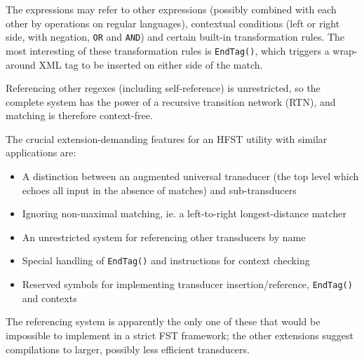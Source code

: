 \documentclass{llncs}
\begin{document}
The expressions may refer to other expressions (possibly combined with each
other by operations on regular languages), contextual conditions
(left or right side, with negation, \verb!OR! and \verb!AND!) and certain
built-in transformation rules. The most interesting of these transformation
rules is \verb!EndTag()!, which triggers a wrap-around XML tag to be inserted
on either side of the match.

Referencing other regexes (including self-reference) is unrestricted, so
the complete system has the power of a recursive transition network (RTN),
and matching is therefore context-free.

The crucial extension-demanding features for an HFST utility
with similar applications are:

\begin{itemize}
\item A distinction between an augmented universal transducer (the top level
  which echoes all input in the absence of matches) and sub-transducers
\item Ignoring non-maximal matching, ie. a left-to-right longest-distance
  matcher
\item An unrestricted system for referencing other transducers by name
\item Special handling of \verb!EndTag()! and instructions for context
  checking
\item Reserved symbols for implementing transducer insertion/reference,
  \verb!EndTag()! and contexts
\end{itemize}

The referencing system is apparently the only one of these that would be
impossible to implement in a strict FST framework; the other extensions suggest
compilations to larger, possibly less efficient transducers.



\end{document}
